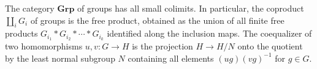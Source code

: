  The category $\mathbf{Grp}$ of groups has all small colimits. In particular, the coproduct $\coprod_i G_i$ of groups is the free product, obtained as the union of all finite free products $G_{i_1} * G_{i_2} * \cdots * G_{i_k}$ identified along the inclusion maps. The coequalizer of two homomorphisms $u, v : G \to H$ is the projection $H \to H/N$ onto the quotient by the least normal subgroup $N$ containing all elements $(u g)(v g)^{-1}$ for $g \in G$.
